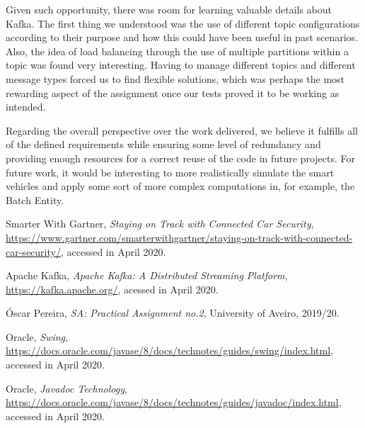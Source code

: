 \documentclass[12pt]{article}
\begin{document}
Given such opportunity, there was room for learning valuable details about Kafka.
The first thing we understood was the use of different topic configurations according to their purpose and how this could have been useful in past scenarios.
Also, the idea of load balancing through the use of multiple partitions within a topic was found very interesting.
Having to manage different topics and different message types forced us to find flexible solutions, which was perhaps the most rewarding aspect of the 
assignment once our tests proved it to be working as intended.

Regarding the overall perspective over the work delivered, we believe it fulfills all of the defined requirements while ensuring some level of redundancy and 
providing enough resources for a correct reuse of the code in future projects.
For future work, it would be interesting to more realistically simulate the smart vehicles and apply some sort of more complex computations in, for example, the 
Batch Entity. 

\begin{thebibliography}{9} %
  

    Smarter With Gartner,
    \textit{Staying on Track with Connected Car Security},
    \url{https://www.gartner.com/smarterwithgartner/staying-on-track-with-connected-car-security/},
    accessed in April 2020.

    Apache Kafka,
    \textit{Apache Kafka: A Distributed Streaming Platform},
    \url{https://kafka.apache.org/},
    acessed in April 2020.

    Óscar Pereira,
    \textit{SA: Practical Assignment no.2},
    University of Aveiro,
    2019/20.

    Oracle,
    \textit{Swing},
    \url{https://docs.oracle.com/javase/8/docs/technotes/guides/swing/index.html},
    accessed in April 2020.

    Oracle,
    \textit{Javadoc Technology},
    \url{https://docs.oracle.com/javase/8/docs/technotes/guides/javadoc/index.html},
    accessed in April 2020.


    
 

\end{thebibliography}

\clearpage
\end{document}
